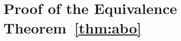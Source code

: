 \documentclass[manuscript, screen, review]{acmart}
\begin{document}











\section{Proof of the Equivalence Theorem~\ref{thm:abo}}
\label{sec:proof}
\end{document}
